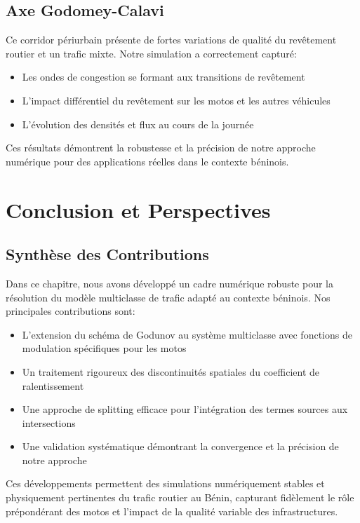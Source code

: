 \subsection{Axe Godomey-Calavi}
\label{subsec:axe_godomey}

Ce corridor périurbain présente de fortes variations de qualité du revêtement routier et un trafic mixte. Notre simulation a correctement capturé:

\begin{itemize}
\item Les ondes de congestion se formant aux transitions de revêtement
\item L'impact différentiel du revêtement sur les motos et les autres véhicules
\item L'évolution des densités et flux au cours de la journée
\end{itemize}

Ces résultats démontrent la robustesse et la précision de notre approche numérique pour des applications réelles dans le contexte béninois.

\section{Conclusion et Perspectives}
\label{sec:conclusion_schemas}

\subsection{Synthèse des Contributions}
\label{subsec:synthese}

Dans ce chapitre, nous avons développé un cadre numérique robuste pour la résolution du modèle multiclasse de trafic adapté au contexte béninois. Nos principales contributions sont:

\begin{itemize}
\item L'extension du schéma de Godunov au système multiclasse avec fonctions de modulation spécifiques pour les motos
\item Un traitement rigoureux des discontinuités spatiales du coefficient de ralentissement
\item Une approche de splitting efficace pour l'intégration des termes sources aux intersections
\item Une validation systématique démontrant la convergence et la précision de notre approche
\end{itemize}

Ces développements permettent des simulations numériquement stables et physiquement pertinentes du trafic routier au Bénin, capturant fidèlement le rôle prépondérant des motos et l'impact de la qualité variable des infrastructures.

